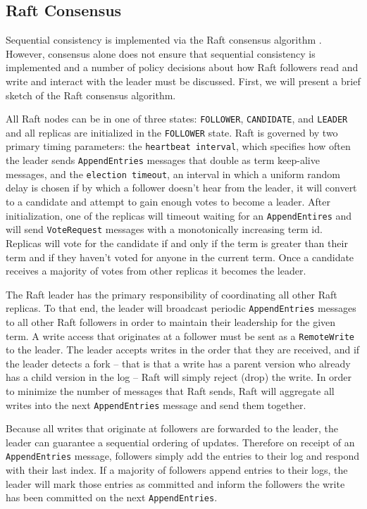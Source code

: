 \documentclass[10pt,conference,compsocconf,letterpaper]{IEEEtran}
\begin{document}
\subsection{Raft Consensus}

Sequential consistency is implemented via the Raft consensus algorithm \cite{ongaro_search_2014}. However, consensus alone does not ensure that sequential consistency is implemented and a number of policy decisions about how Raft followers read and write and interact with the leader must be discussed. First, we will present a brief sketch of the Raft consensus algorithm.

All Raft nodes can be in one of three states: \texttt{FOLLOWER}, \texttt{CANDIDATE}, and \texttt{LEADER} and all replicas are initialized in the \texttt{FOLLOWER} state. Raft is governed by two primary timing parameters: the \texttt{heartbeat interval}, which specifies how often the leader sends \texttt{AppendEntries} messages that double as term keep-alive messages, and the \texttt{election timeout}, an interval in which a uniform random delay is chosen if by which a follower doesn't hear from the leader, it will convert to a candidate and attempt to gain enough votes to become a leader. After initialization, one of the replicas will timeout waiting for an \texttt{AppendEntires} and will send \texttt{VoteRequest} messages with a monotonically increasing term id. Replicas will vote for the candidate if and only if the term is greater than their term and if they haven't voted for anyone in the current term. Once a candidate receives a majority of votes from other replicas it becomes the leader.

The Raft leader has the primary responsibility of coordinating all other Raft replicas. To that end, the leader will broadcast periodic \texttt{AppendEntries} messages to all other Raft followers in order to maintain their leadership for the given term. A write access that originates at a follower must be sent as a \texttt{RemoteWrite} to the leader. The leader accepts writes in the order that they are received, and if the leader detects a fork -- that is that a write has a parent version who already has a child version in the log -- Raft will simply reject (drop) the write. In order to minimize the number of messages that Raft sends, Raft will aggregate all writes into the next \texttt{AppendEntries} message and send them together.

Because all writes that originate at followers are forwarded to the leader, the leader can guarantee a sequential ordering of updates. Therefore on receipt of an \texttt{AppendEntries} message, followers simply add the entries to their log and respond with their last index. If a majority of followers append entries to their logs, the leader will mark those entries as committed and inform the followers the write has been committed on the next \texttt{AppendEntries}.
\end{document}

